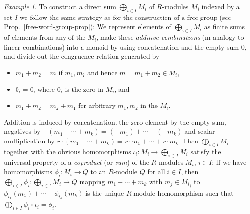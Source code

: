 \documentclass{amsart}
\theoremstyle{plain}
\numberwithin{equation}{section} %
\numberwithin{figure}{section} %
\theoremstyle{plain}
\theoremstyle{plain}
\theoremstyle{plain}
\theoremstyle{plain}
\theoremstyle{plain}
\theoremstyle{plain}
\theoremstyle{remark}
\theoremstyle{remark}
\theoremstyle{remark}
\newtheorem{exm}[thm]{Example}
\begin{document}
\begin{exm} \label{direct-sum-ex}
To construct a direct sum $\bigoplus_{i \in I} M_i$ of $R$-modules $M_i$ indexed by a set $I$ we follow the same strategy as for the construction of a free group (see Prop.~\ref{free-word-group-prop}): We represent elements of $\bigoplus_{i \in I} M_i$ as finite sums of elements from any of the $M_i$, make these \textit{additive combinations} (in analogy to linear combinations) into a monoid by using concatenation and the empty sum $0$, and divide out the congruence relation generated by
\begin{itemize}
\item $m_1 + m_2 = m$ if $m_1, m_2$ and hence $m = m_1 + m_2 \in M_i$,
\item $0_i = 0$, where $0_i$ is the zero in $M_i$, and
\item $m_1 + m_2 = m_2 + m_1$ for arbitrary $m_1, m_2$ in the $M_i$.
\end{itemize} 
Addition is induced by concatenation, the zero element by the empty sum, negatives by $-(m_1 + \cdots + m_k) = (-m_1) + \cdots + (-m_k)$ and scalar multiplication by $r \cdot (m_1 + \cdots + m_k) = r \cdot m_1 + \cdots + r \cdot m_k$. Then $\bigoplus_{i \in I} M_i$ together with the obvious homomorphisms $\iota_i: M_i \rightarrow \bigoplus_{i \in I} M_i$ satisfy the universal property of a \textit{coproduct} (or \textit{sum}) of the $R$-modules $M_i$, $i \in I$: If we have homomorphisms $\phi_i : M_i \rightarrow Q$ to an $R$-module $Q$ for all $i \in I$, then $\bigoplus_{i \in I} \phi_i: \bigoplus_{i \in I} M_i \rightarrow Q$ mapping
$m_1 + \cdots + m_k$ with $m_j \in M_{i_j}$ to $\phi_{i_1}(m_1) + \cdots + \phi_{i_k}(m_k)$ is the unique $R$-module homomorphism such that $\bigoplus_{i \in I} \phi_i \circ \iota_i = \phi_i$.


\end{exm}
\end{document}

